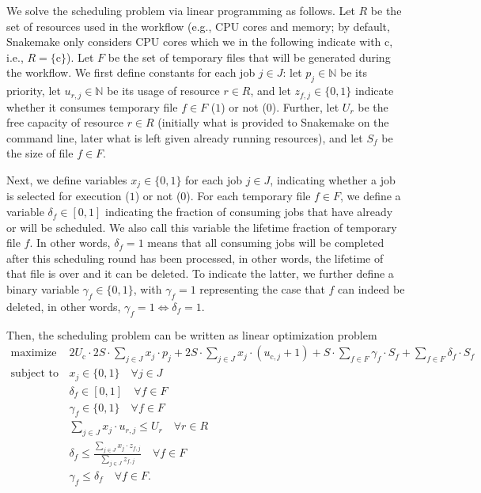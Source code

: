 \documentclass[parskip=half]{scrartcl}
\begin{document}
\newcommand{\N}{\mathbb{N}}
\newcommand{\cores}{\text{c}}

We solve the scheduling problem via linear programming as follows.
Let $R$ be the set of resources used in the workflow (e.g., CPU cores and memory; by default, Snakemake only considers CPU cores which we in the following indicate with $\cores$, i.e., $R = \{\cores\}$).
Let $F$ be the set of temporary files that will be generated during the workflow.
We first define constants for each job $j \in J$: let $p_j \in \N$ be its priority, let $u_{r,j} \in \N$ be its usage of resource $r \in R$, and let $z_{f,j} \in \{0,1\}$ indicate whether it consumes temporary file $f \in F$ ($1$) or not ($0$).
Further, let $U_r$ be the free capacity of resource $r \in R$ (initially what is provided to Snakemake on the command line, later what is left given already running resources), and let $S_f$ be the size of file $f \in F$.

Next, we define variables $x_j \in \{0,1\}$ for each job $j \in J$, indicating whether a job is selected for execution ($1$) or not ($0$).
For each temporary file $f \in F$, we define a variable $\delta_f \in [0,1]$ indicating the fraction of consuming jobs that have already or will be scheduled.
We also call this variable the lifetime fraction of temporary file $f$.
In other words, $\delta_f = 1$ means that all consuming jobs will be completed after this scheduling round has been processed, in other words, the lifetime of that file is over and it can be deleted.
To indicate the latter, we further define a binary variable $\gamma_f \in \{0,1\}$, with $\gamma_f = 1$ representing the case that $f$ can indeed be deleted, in other words, $\gamma_f = 1 \Leftrightarrow \delta_f = 1$.

Then, the scheduling problem can be written as linear optimization problem
\begin{align*}
	\text{maximize } & 2U_\cores \cdot 2S \cdot \sum_{j \in J} x_j \cdot p_j + 2S \cdot \sum_{j \in J} x_j \cdot (u_{\cores,j} + 1) + S \cdot \sum_{f \in F} \gamma_f \cdot S_f + \sum_{f \in F} \delta_f \cdot S_f \\ \text{subject to } & x_j \in \{0,1\} \quad \forall j \in J\\ \quad & \delta_f \in [0,1] \quad  \forall f \in F\\ \quad & \gamma_f \in \{0,1\} \quad \forall f \in F\\ \quad & \sum_{j \in J} x_j \cdot u_{r,j} \leq U_r \quad \forall r \in R\\ \quad & \delta_f \leq \frac{\sum_{j \in J} x_j \cdot z_{f,j}}{\sum_{j \in J} z_{f,j}} \quad\forall f \in F\\ \quad & \gamma_f \leq \delta_f \quad\forall f \in F.
\end{align*}
\end{document}
